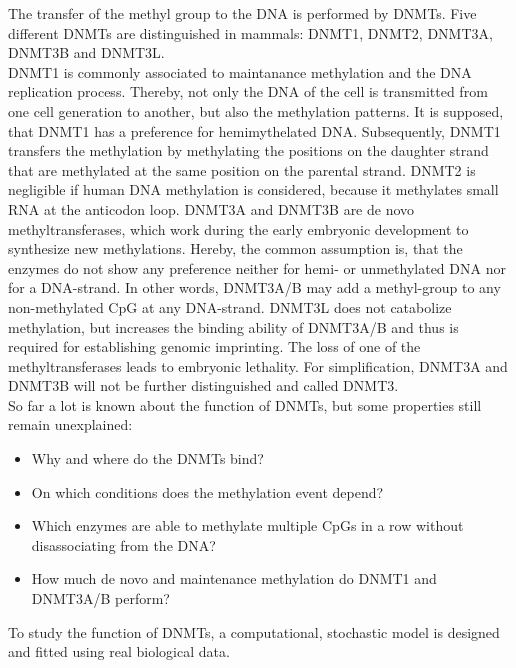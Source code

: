 The transfer of the methyl group to the DNA is performed by \acfp{DNMT}. Five different \acp{DNMT} are distinguished in mammals: DNMT1, DNMT2, DNMT3A, DNMT3B and DNMT3L\cite{DNAMethylation}.\\
DNMT1 is commonly associated to maintanance methylation and the DNA replication process. Thereby, not only the DNA of the cell is transmitted from one cell generation to another, but also the methylation patterns. It is supposed, that DNMT1 has a preference for hemimythelated DNA. Subsequently, DNMT1 transfers the methylation by methylating the positions on the daughter strand that are methylated at the same position on the parental strand\cite{DNAMethylation}.\newline
DNMT2 is negligible if human DNA methylation is considered, because it methylates small RNA at the anticodon loop\cite{DNMT2}.\newline
DNMT3A and DNMT3B are de novo methyltransferases, which work during the early embryonic development to synthesize new methylations. Hereby, the common assumption is, that the enzymes do not show any preference neither for hemi- or unmethylated DNA nor for a DNA-strand. In other words, DNMT3A/B may add a methyl-group to any non-methylated \ac{CpG} at any DNA-strand. DNMT3L does not catabolize methylation, but increases the binding ability of DNMT3A/B and thus is required for establishing genomic imprinting\cite{DNAMethylation}.\newline
The loss of one of the methyltransferases leads to embryonic lethality\cite{DNAMethylation}.\newline
For simplification, DNMT3A and DNMT3B will not be further distinguished and called DNMT3.\\

So far a lot is known about the function of \acp{DNMT}, but some properties still remain unexplained:
\begin{itemize}
\item Why and where do the \acp{DNMT} bind?
\item On which conditions does the methylation event depend?
\item Which enzymes are able to methylate multiple \acp{CpG} in a row without disassociating from the DNA?
\item How much de novo and maintenance methylation do DNMT1 and DNMT3A/B perform?
\end{itemize}

To study the function of \acp{DNMT}, a computational, stochastic model is designed and fitted using real biological data.

